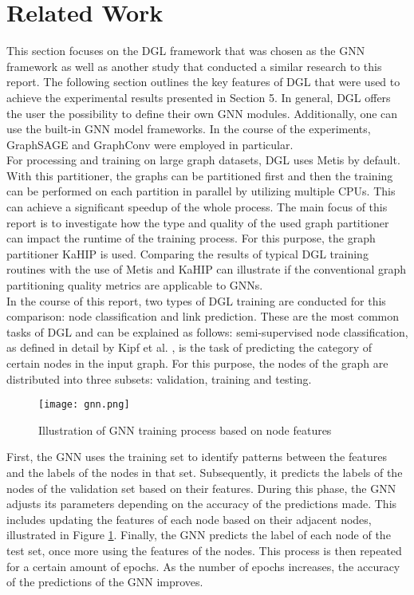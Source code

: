 \documentclass[acmsmall,nonacm,screen,review]{acmart}
\begin{document}
\section{Related Work}
This section focuses on the DGL framework that was chosen as the GNN framework as well as another study that conducted a similar research to this report. The following section outlines the key features of DGL that were used to achieve the experimental results presented in Section 5. In general, DGL offers the user the possibility to define their own GNN modules. Additionally, one can use the built-in GNN model frameworks. In the course of the experiments, GraphSAGE \cite{GraphSAGE} and GraphConv \cite{NC} were employed in particular. \\
For processing and training on large graph datasets, DGL uses Metis by default. With this partitioner, the graphs can be partitioned first and then the training can be performed on each partition in parallel by utilizing multiple CPUs. This can achieve a significant speedup of the whole process. The main focus of this report is to investigate how the type and quality of the used graph partitioner can impact the runtime of the training process. For this purpose, the graph partitioner KaHIP is used. Comparing the results of typical DGL training routines with the use of Metis and KaHIP can illustrate if the conventional graph partitioning quality metrics are applicable to GNNs. \\
In the course of this report, two types of DGL training are conducted for this comparison: node classification and link prediction. These are the most common tasks of DGL and can be explained as follows: semi-supervised node classification, as defined in detail by Kipf et al. \cite{NC}, is the task of predicting the category of certain nodes in the input graph. For this purpose, the nodes of the graph are distributed into three subsets: validation, training and testing. \\  
\begin{figure}[bt!]
    \centering
    \texttt{[image: gnn.png]}
    \caption{Illustration of GNN training process based on node features}
    \label{learning}
\end{figure}
First, the GNN uses the training set to identify patterns between the features and the labels of the nodes in that set. Subsequently, it predicts the labels of the nodes of the validation set based on their features. During this phase, the GNN adjusts its parameters depending on the accuracy of the predictions made. This includes updating the features of each node based on their adjacent nodes, illustrated in Figure \ref{learning}. Finally, the GNN predicts the label of each node of the test set, once more using the features of the nodes. This process is then repeated for a certain amount of epochs. As the number of epochs increases, the accuracy of the predictions of the GNN improves. \\
\end{document}
